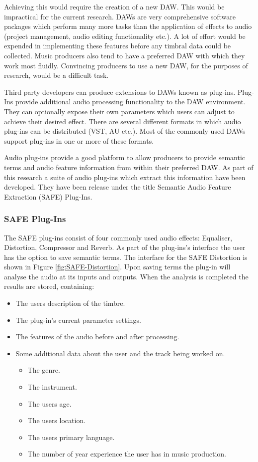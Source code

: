 			Achieving this would require the creation of a new DAW. This would be impractical for the current
			research. DAWs are very comprehensive software packages which perform many more tasks than the
			application of effects to audio (project management, audio editing functionality etc.). A lot of
			effort would be expended in implementing these features before any timbral data could be collected.
			Music producers also tend to have a preferred DAW with which they work most fluidly. Convincing
			producers to use a new DAW, for the purposes of research, would be a difficult task.

			Third party developers can produce extensions to DAWs known as plug-ins. Plug-Ins provide additional
			audio processing functionality to the DAW environment. They can optionally expose their own
			parameters which users can adjust to achieve their desired effect. There are several different
			formats in which audio plug-ins can be distributed (VST, AU etc.). Most of the commonly used DAWs
			support plug-ins in one or more of these formats.

			Audio plug-ins provide a good platform to allow producers to provide semantic terms and audio
			feature information from within their preferred DAW. As part of this research a suite of audio
			plug-ins which extract this information have been developed. They have been release under the title
			Semantic Audio Feature Extraction (SAFE) Plug-Ins.

		\subsubsection{SAFE Plug-Ins}
			The SAFE plug-ins consist of four commonly used audio effects: Equaliser, Distortion, Compressor and
			Reverb. As part of the plug-ins's interface the user has the option to save semantic terms. The
			interface for the SAFE Distortion is shown in Figure \ref{fig:SAFE-Distortion}. Upon saving terms
			the plug-in will analyse the audio at its inputs and outputs. When the analysis is completed the
			results are stored, containing:

			\begin{itemize}
				\item The users description of the timbre.
				\item The plug-in's current parameter settings.
				\item The features of the audio before and after processing.
				\item Some additional data about the user and the track being worked on.
				\begin{itemize}
					\item The genre.
					\item The instrument.
					\item The users age.
					\item The users location.
					\item The users primary language.
					\item The number of year experience the user has in music production.
				\end{itemize}
			\end{itemize}

